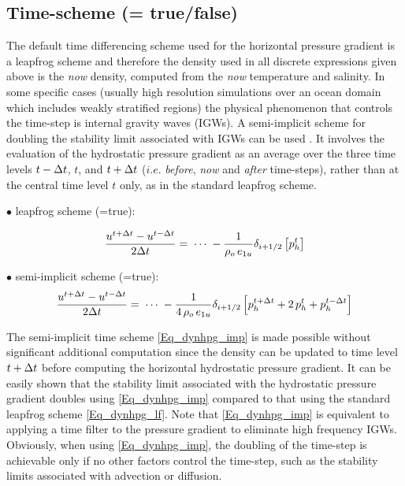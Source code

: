 \subsection   [Time-scheme (\np{ln\_dynhpg\_imp}) ]
			{Time-scheme (= true/false)}
\label{DYN_hpg_imp}

The default time differencing scheme used for the horizontal pressure gradient is 
a leapfrog scheme and therefore the density used in all discrete expressions given 
above is the  \textit{now} density, computed from the \textit{now} temperature and 
salinity. In some specific cases (usually high resolution simulations over an ocean 
domain which includes weakly stratified regions) the physical phenomenon that 
controls the time-step is internal gravity waves (IGWs). A semi-implicit scheme for 
doubling the stability limit associated with IGWs can be used \citep{Brown_Campana_MWR78, 
Maltrud1998}. It involves the evaluation of the hydrostatic pressure gradient as an 
average over the three time levels $t-\Delta t$, $t$, and $t+\Delta t$ ($i.e.$  
\textit{before},  \textit{now} and  \textit{after} time-steps), rather than at the central 
time level $t$ only, as in the standard leapfrog scheme. 

$\bullet$ leapfrog scheme (=true):

\begin{equation} \label{Eq_dynhpg_lf}
\frac{u^{t+\Delta t}-u^{t-\Delta t}}{2\Delta t} = \;\cdots \;
	-\frac{1}{\rho _o \,e_{1u} }\delta _{i+1/2} \left[ {p_h^t } \right]
\end{equation}

$\bullet$ semi-implicit scheme (=true):
\begin{equation} \label{Eq_dynhpg_imp}
\frac{u^{t+\Delta t}-u^{t-\Delta t}}{2\Delta t} = \;\cdots \;
	-\frac{1}{4\,\rho _o \,e_{1u} } \delta_{i+1/2} \left[ p_h^{t+\Delta t} +2\,p_h^t +p_h^{t-\Delta t}  \right]
\end{equation}

The semi-implicit time scheme \eqref{Eq_dynhpg_imp} is made possible without 
significant additional computation since the density can be updated to time level 
$t+\Delta t$ before computing the horizontal hydrostatic pressure gradient. It can 
be easily shown that the stability limit associated with the hydrostatic pressure 
gradient doubles using \eqref{Eq_dynhpg_imp} compared to that using the 
standard leapfrog scheme \eqref{Eq_dynhpg_lf}. Note that \eqref{Eq_dynhpg_imp} 
is equivalent to applying a time filter to the pressure gradient to eliminate high 
frequency IGWs. Obviously, when using \eqref{Eq_dynhpg_imp}, the doubling of 
the time-step is achievable only if no other factors control the time-step, such as 
the stability limits associated with advection or diffusion.

